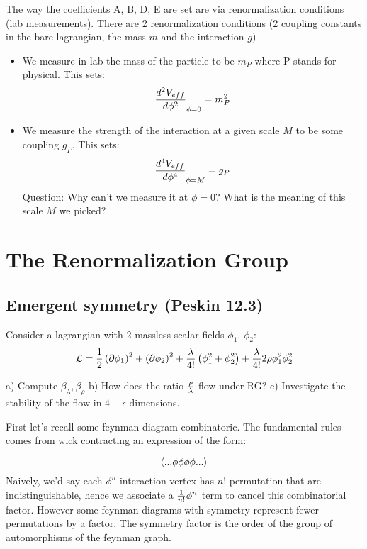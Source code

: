 \documentclass[9pt]{scrartcl}
\begin{document}
The way the coefficients A, B, D, E are set are via renormalization conditions (lab measurements).
There are 2 renormalization conditions (2 coupling constants in the bare lagrangian, the mass $m$ and the interaction $g$)
\begin{itemize}
\item We measure in lab the mass of the particle to be $m_P$ where P stands for physical.  This sets: $${d^2 V_{eff} \over d \phi^2}_{\phi=0} = m_P^2$$
\item We measure the strength of the interaction at a given scale $M$ to be some coupling $g_P$.  This sets:
$$ {d^4 V_{eff} \over d \phi^4}_{\phi = M} = g_P$$
Question: Why can't we measure it at $\phi = 0$?  What is the meaning of this scale $M$ we picked?
\end{itemize}


\section{The Renormalization Group}

\subsection{Emergent symmetry (Peskin 12.3)}

\begin{problem}
	Consider a lagrangian with 2 massless scalar fields $\phi_1$, $\phi_2$:
		$$\mathcal{L} = \frac12 \left(\partial \phi_1 \right)^2 + \left(\partial \phi_2 \right)^2 + {\lambda \over 4!} \left(\phi_1^2 + \phi_2^2 \right) + 
		{\lambda \over 4!} 2 \rho \phi_1^2 \phi_2^2$$
	
	a) Compute $\beta_{\lambda}, \beta_\rho$
	b) How does the ratio ${\rho \over \lambda}$ flow under RG?
	c) Investigate the stability of the flow in $4 - \epsilon$ dimensions.
\end{problem}

First let's recall some feynman diagram combinatoric.  The fundamental rules comes from wick contracting an expression of the form:

$$	\braket{... \phi \phi \phi \phi ...}$$
Naively, we'd say each $\phi^n$ interaction vertex has $n!$ permutation that are indistinguishable, hence we associate a ${1 \over n!} \phi^n$ term to cancel this combinatorial factor.  However some feynman diagrams with symmetry represent fewer permutations by a  factor.  The symmetry factor is the order of the group of automorphisms of the feynman graph.
\end{document}
